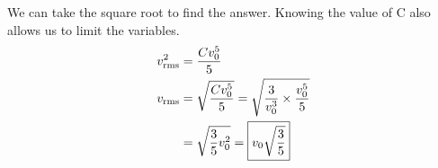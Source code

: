 \documentclass[12pt]{article}
\begin{document}
            We can take the square root to find the answer.
            Knowing the value of C also allows us to limit the variables.
            \begin{align}
                v_{\rm rms}^2   &=  \frac{Cv_0^5}{5}\\
                v_{\rm rms}     &=  \sqrt{\frac{Cv_0^5}{5}}
                    =   \sqrt{\frac{3}{v_0^3} \times \frac{v_0^5}{5}}\\
                    &=  \sqrt{\frac{3}{5} v_0^2}
                    =   \boxed{v_0 \sqrt{\frac{3}{5}}}
            \end{align}

    \pagebreak
    
    \tableofcontents
\end{document}
